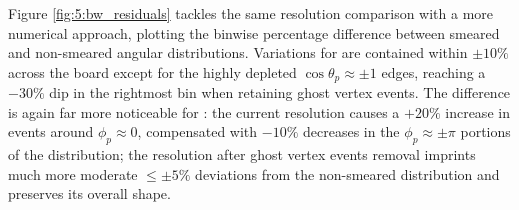 Figure \ref{fig:5:bw_residuals} tackles the same resolution comparison with a more numerical approach, plotting the binwise percentage difference between smeared and non-smeared angular distributions.
Variations for \cthetap are contained within $\pm 10\%$ across the board except for the highly depleted  $\cos\theta_p \approx \pm 1$ edges, reaching a $-30\%$ dip in the rightmost bin when retaining ghost vertex events.
The difference is again far more noticeable for \phip: the current resolution causes a $+20\%$ increase in events around $\phi_p \approx 0$, compensated with $-10\%$ decreases in the $\phi_p \approx \pm \pi$ portions of the distribution;
the resolution after ghost vertex events removal imprints much more moderate $\leq \pm 5\%$ deviations from the non-smeared distribution and preserves its overall shape.